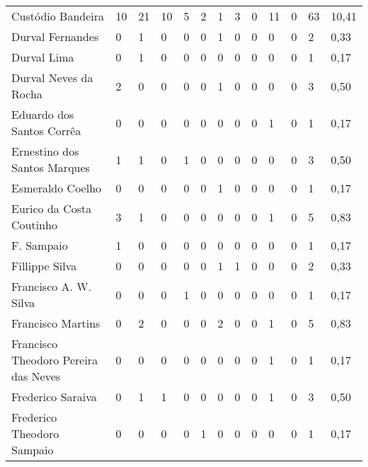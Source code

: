 \begin{table}[!htp]
{\begin{tabular}{lllllllllllll}
Custódio Bandeira	&10	&21	&10	&5	&2	&1	&3	&0	&11	&0	&63	&10,41\\
Durval Fernandes	&0	&1	&0	&0	&0	&1	&0	&0	&0	&0	&2	&0,33\\
Durval Lima	&0	&1	&0	&0	&0	&0	&0	&0	&0	&0	&1	&0,17\\
Durval Neves da Rocha	&2	&0	&0	&0	&0	&1	&0	&0	&0	&0	&3	&0,50\\
Eduardo dos Santos Corrêa	&0	&0	&0	&0	&0	&0	&0	&0	&1	&0	&1	&0,17\\
Ernestino dos Santos Marques	&1	&1	&0	&1	&0	&0	&0	&0	&0	&0	&3	&0,50\\
Esmeraldo Coelho	&0	&0	&0	&0	&0	&1	&0	&0	&0	&0	&1	&0,17\\
Eurico da Costa Coutinho	&3	&1	&0	&0	&0	&0	&0	&0	&1	&0	&5	&0,83\\
F. Sampaio	&1	&0	&0	&0	&0	&0	&0	&0	&0	&0	&1	&0,17\\
Fillippe Silva	&0	&0	&0	&0	&0	&1	&1	&0	&0	&0	&2	&0,33\\
Francisco A. W. Silva	&0	&0	&0	&1	&0	&0	&0	&0	&0	&0	&1	&0,17\\
Francisco Martins	&0	&2	&0	&0	&0	&2	&0	&0	&1	&0	&5	&0,83\\
Francisco Theodoro Pereira das Neves	&0	&0	&0	&0	&0	&0	&0	&0	&1	&0	&1	&0,17\\
Frederico Saraiva	&0	&1	&1	&0	&0	&0	&0	&0	&1	&0	&3	&0,50\\
Frederico Theodoro Sampaio	&0	&0	&0	&0	&1	&0	&0	&0	&0	&0	&1	&0,17\\
\bottomrule
\end{tabular} 
}
{}
\end{table}


